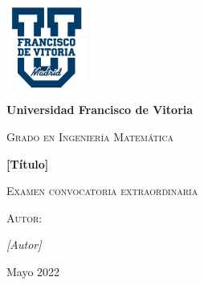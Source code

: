 
\begin{titlepage}
    \begin{center}
        \vspace{1cm}
        
        \includegraphics[width=0.2\textwidth]{ImagenesLatex/ufv_logo}
        \vspace{1cm}
        
        \LARGE\textbf{Universidad Francisco de Vitoria}
        \vspace{0.5cm}
        
        \Large\textsc{Grado en Ingeniería Matemática}
        \vspace{1cm}
        
        
        \Huge\textbf{[Título]}
        \vspace{7cm}
        
        \Large\textsc{Examen convocatoria extraordinaria}
        \vspace{0.5cm}
        
        \Large\textsc{Autor:}
        \vspace{0.1cm}
        
        \Large\textit{[Autor]}
        \vspace{1cm}
        
        \Large\textmd{Mayo 2022}
        \vfill
        
    \end{center}
\end{titlepage}
